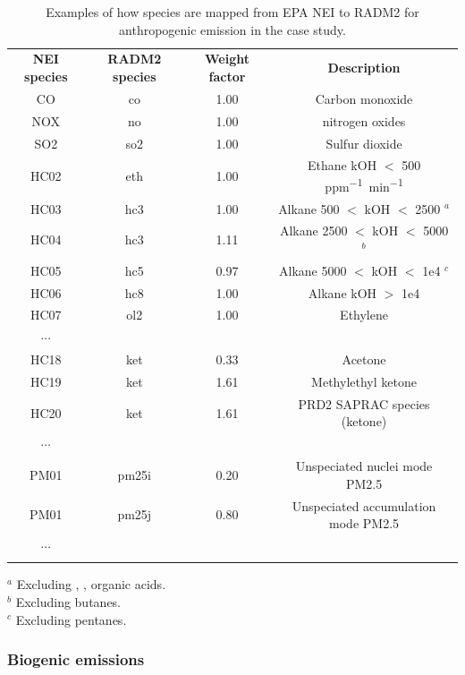 	\begin{table}[htb]
	\caption[Examples of NEI-RADM2 speciation mapping]{Examples of how species are mapped from EPA NEI to RADM2 for anthropogenic emission in the case study.}
	\begin{center}
	\begin{tabular}{cccc}\tophline 
		{\bf NEI species} & {\bf RADM2 species} & {\bf Weight factor} & {\bf Description}  \\ \middlehline
		CO & co & 1.00 & Carbon monoxide\\  
		NOX & no & 1.00 & nitrogen oxides \\  
		SO2 & so2 & 1.00 & Sulfur dioxide \\ 
		HC02 & eth & 1.00 & Ethane kOH $<$ 500 \unit{ppm^{-1}~min^{-1}}\\  
		HC03 & hc3 & 1.00 & Alkane 500 $<$ kOH $<$ 2500 ${}^a$\\  
		HC04 & hc3 & 1.11 & Alkane 2500 $<$ kOH $<$ 5000 ${}^b$\\  
		HC05 & hc5 & 0.97 & Alkane 5000 $<$ kOH $<$ 1e4 ${}^c$\\  
		HC06 & hc8 & 1.00 & Alkane kOH $>$ 1e4 \\  
		HC07 & ol2 & 1.00 & Ethylene\\  
		$\cdots$ &  &  & \\  
		HC18 & ket & 0.33 & Acetone\\  
		HC19 & ket & 1.61 & Methylethyl ketone\\  
		HC20 & ket & 1.61 & PRD2 SAPRAC species (ketone)\\  
		$\cdots$ &  &  & \\  
		PM01 & pm25i & 0.20 & Unspeciated nuclei mode PM2.5\\  
		PM01 & pm25j & 0.80 & Unspeciated accumulation mode PM2.5\\  
		$\cdots$ &  &  & \\ \bottomhline 
	\end{tabular} \label{table:2006/emiss_v03}
	\end{center}{
	\footnotesize
	${}^a$ Excluding , , organic acids.
	\\ ${}^b$ Excluding butanes.
	\\ ${}^c$ Excluding pentanes.
	}
	\end{table}

	\subsubsection{Biogenic emissions}\label{sssec:2006/method/emiss/bio}

